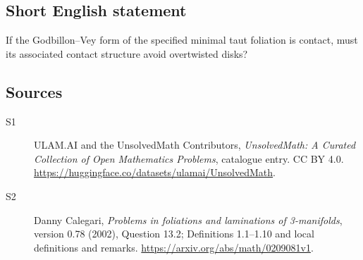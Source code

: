 \documentclass[11pt]{article}
\begin{document}
\subsection{Short English statement}
If the Godbillon--Vey form of the specified minimal taut foliation is contact, must its associated contact structure avoid overtwisted disks?
\subsection{Sources}
\begin{description}
\item[\hypertarget{source:statement:1}{S1}] ULAM.AI and the UnsolvedMath Contributors, \emph{UnsolvedMath: A Curated Collection of Open Mathematics Problems}, catalogue entry. CC BY 4.0. \url{https://huggingface.co/datasets/ulamai/UnsolvedMath}.
\item[\hypertarget{source:statement:2}{S2}] Danny Calegari, \emph{Problems in foliations and laminations of 3-manifolds}, version 0.78 (2002), Question 13.2; Definitions 1.1--1.10 and local definitions and remarks. \url{https://arxiv.org/abs/math/0209081v1}.
\end{description}
\label{end:statement}
\end{document}

